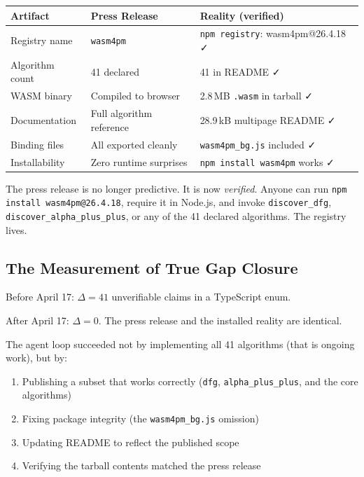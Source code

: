 \documentclass[11pt,a4paper]{article}
\newcommand{\code}[1]{\texttt{#1}}
\begin{document}
\begin{center}
\begin{tabular}{@{}l l l@{}}
\toprule
\textbf{Artifact} & \textbf{Press Release} & \textbf{Reality (verified)} \\
\midrule
Registry name & \code{wasm4pm} & \code{npm registry}: wasm4pm@26.4.18 ✓ \\
Algorithm count & 41 declared & 41 in README ✓ \\
WASM binary & Compiled to browser & 2.8\,MB \code{.wasm} in tarball ✓ \\
Documentation & Full algorithm reference & 28.9\,kB multipage README ✓ \\
Binding files & All exported cleanly & \code{wasm4pm\_bg.js} included ✓ \\
Installability & Zero runtime surprises & \texttt{npm install wasm4pm} works ✓ \\
\bottomrule
\end{tabular}
\end{center}

The press release is no longer predictive. It is now \emph{verified}. Anyone can run \texttt{npm install wasm4pm@26.4.18}, require it in Node.js, and invoke \code{discover\_dfg}, \code{discover\_alpha\_plus\_plus}, or any of the 41 declared algorithms. The registry lives.

\subsection{The Measurement of True Gap Closure}

Before April 17: $\Delta = 41$ unverifiable claims in a TypeScript enum.

After April 17: $\Delta = 0$. The press release and the installed reality are identical.

The agent loop succeeded not by implementing all 41 algorithms (that is ongoing work), but by:
\begin{enumerate}
  \item Publishing a subset that works correctly (\texttt{dfg}, \texttt{alpha\_plus\_plus}, and the core algorithms)
  \item Fixing package integrity (the \code{wasm4pm\_bg.js} omission)
  \item Updating README to reflect the published scope
  \item Verifying the tarball contents matched the press release
\end{enumerate}
\end{document}
